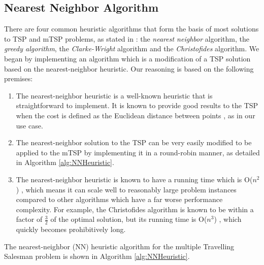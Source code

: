 \subsection{Nearest Neighbor Algorithm}
There are four common heuristic algorithms that form the basis of most solutions to TSP and mTSP problems, as stated in \cite{Johnson1997TheOptimization}: the \textit{nearest neighbor} algorithm, the \textit{greedy algorithm}, the \textit{Clarke-Wright} algorithm and the \textit{Christofides} algorithm. We began by implementing an algorithm which is a modification of a TSP solution based on the nearest-neighbor heuristic. Our reasoning is based on the following premises:
\begin{enumerate}
    \item The nearest-neighbor heuristic is a well-known heuristic that is straightforward to implement. It is known to provide good results to the TSP when the cost is defined as the Euclidean distance between points \cite{Johnson1997TheOptimization}, as in our use case.
    \item The nearest-neighbor solution to the TSP can be very easily modified to be applied to the mTSP by implementing it in a round-robin manner, as detailed in Algorithm \ref{alg:NNHeuristic}.
    \item The nearest-neighbor heuristic is known to have a running time which is O($n^2$) \cite{Rosenkrantz1977AnProblem}, which means it can scale well to reasonably large problem instances compared to other algorithms which have a far worse performance complexity. For example, the Christofides algorithm is known to be within a factor of $\frac{3}{2}$ of the optimal solution, but its running time is O($n^3$) \cite{Christofides1976WORST-CASEPROBLEM}, which quickly becomes prohibitively long.
\end{enumerate}

The nearest-neighbor (NN) heuristic algorithm for the multiple Travelling Salesman problem is shown in Algorithm \ref{alg:NNHeuristic}.


